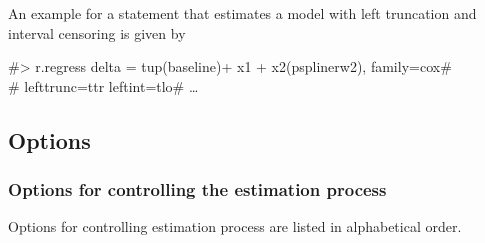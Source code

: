 An example for a statement that estimates a model with left
truncation and interval censoring is given by

 #> r.regress delta = tup(baseline)+ x1 + x2(psplinerw2), family=cox#\\
 #  lefttrunc=ttr leftint=tlo# \ldots


\subsection{Options}
\label{remlregregressoptions}

\subsubsection*{Options for controlling the estimation process}
\label{remlest_options}

Options for controlling estimation process are listed in
alphabetical order.

